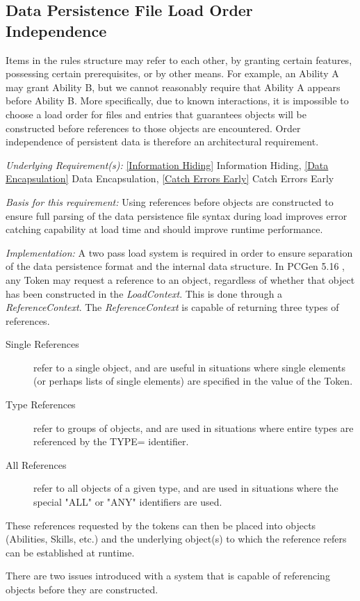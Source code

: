 \documentclass[12pt,letterpaper]{article}
\newcommand{\pcgenversEOS}{5.16}
\newcommand{\pcgenvers}{\pcgenversEOS{} }
\newcommand{\textem}[1]{\emph{#1}}
\newcommand{\lsubsection}[1]{\label{#1}\subsection{#1}}
\newcommand{\myref}[1]{\ref{#1} #1}
\newcommand{\basis}{\noindent\textem{Basis for this requirement:} }
\newcommand{\impl}{\noindent\textem{Implementation:} }
\newcommand{\under}{\noindent\textem{Underlying Requirement(s):} }
\begin{document}
\lsubsection{Data Persistence File Load Order Independence}

Items in the rules structure may refer to each other, by granting certain features, possessing
certain prerequisites, or by other means.  For example, an Ability A may grant Ability B, but
we cannot reasonably require that Ability A appears before Ability B.  More specifically, due
to known interactions, it is impossible to choose a load order for files and entries 
that guarantees objects will be constructed before references to those objects
are encountered.  Order independence of persistent data is therefore an architectural requirement.

\under \myref{Information Hiding}, \myref{Data Encapsulation}, \myref{Catch Errors Early}

\basis Using references before objects are constructed to ensure full parsing of the data
persistence file syntax during load improves error catching capability at load time and 
should improve runtime performance.  

\impl A two pass load system is required in order to ensure separation of the data
persistence format and the internal data structure.  In
PCGen \pcgenvers, any Token may request a reference to an object, regardless of whether that object has 
been constructed in the \textem{LoadContext}.  This is done through a \textem{ReferenceContext}.
The \textem{ReferenceContext} is capable of returning three types of references.  

\begin{description}
\item[Single References] refer to a single object, and are useful in situations where single elements (or 
perhaps lists of single elements) are specified in the value of the Token.  
\item[Type References] refer to groups of objects, and are used in situations where entire types are
referenced by the TYPE= identifier.
\item[All References] refer to all objects of a given type, and are used in situations where the
special "ALL" or "ANY" identifiers are used.
\end{description}

These references requested by the tokens can then be placed into objects (Abilities, Skills, etc.)
and the underlying object(s) to which the reference refers can be established at runtime.

There are two issues introduced with a system that is capable of referencing objects before
they are constructed.  
\end{document}
